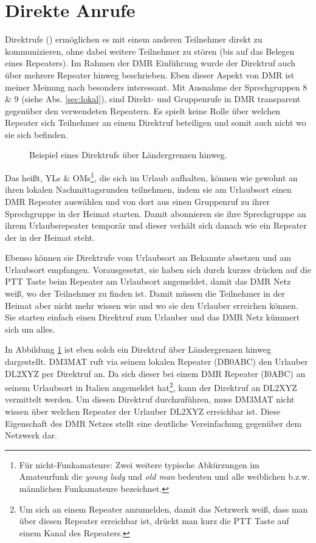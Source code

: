 \section{Direkte Anrufe} \label{sec:privatecall}
Direktrufe () ermöglichen es mit einem anderen Teilnehmer direkt zu kommunizieren, ohne dabei weitere Teilnehmer zu stören (bis auf das Belegen eines Repeaters). Im Rahmen der DMR Einführung wurde der Direktruf auch über mehrere Repeater hinweg beschrieben. Eben dieser Aspekt von DMR ist meiner Meinung nach besonders interessant. Mit Ausnahme der Sprechgruppen 8 \& 9 (siehe Abs. \ref{sec:lokal}), sind Direkt- und Gruppenrufe in DMR transparent gegenüber den verwendeten Repeatern. Es spielt keine Rolle über welchen Repeater sich Teilnehmer an einem Direktruf beteiligen und somit auch nicht wo sie sich befinden. 

\begin{figure}[!ht]
 \centering
 
 \caption{Beispiel eines Direktrufs über Ländergrenzen hinweg.} \label{fig:pc}
\end{figure}

Das heißt, YLs \& OMs\footnote{Für nicht-Funkamateure: Zwei weitere typische Abkürzungen im Amateurfunk die \emph{young lady} und \emph{old man} bedeuten und alle weiblichen b.z.w. männlichen Funkamateure bezeichnet.}, die sich im Urlaub aufhalten, können wie gewohnt an ihren lokalen Nachmittagsrunden teilnehmen, indem sie am Urlaubsort einen DMR Repeater auswählen und von dort aus einen Gruppenruf zu ihrer Sprechgruppe in der Heimat starten. Damit abonnieren sie ihre Sprechgruppe an ihrem Urlaubsrepeater temporär und dieser verhält sich danach wie ein Repeater der in der Heimat steht. 

Ebenso können sie Direktrufe vom Urlaubsort an Bekannte absetzen und am Urlaubsort empfangen. Vorausgesetzt, sie haben sich durch kurzes drücken auf die PTT Taste beim Repeater am Urlaubsort angemeldet, damit das DMR Netz weiß, wo der Teilnehmer zu finden ist. Damit müssen die Teilnehmer in der Heimat aber nicht mehr wissen wie und wo sie den Urlauber erreichen können. Sie starten einfach einen Direktruf zum Urlauber und das DMR Netz kümmert sich um alles.

In Abbildung \ref{fig:pc} ist eben solch ein Direktruf über Ländergrenzen hinweg dargestellt. DM3MAT ruft via seinem lokalen Repeater (DB0ABC) den Urlauber DL2XYZ per Direktruf an. Da sich dieser bei einem DMR Repeater (I0ABC) an seinem Urlaubsort in Italien angemeldet hat\footnote{Um sich an einem Repeater anzumelden, damit das Netzwerk weiß, dass man über diesen Repeater erreichbar ist, drückt man kurz die PTT Taste auf einem Kanal des Repeaters.}, kann der Direktruf an DL2XYZ vermittelt werden. Um diesen Direktruf durchzuführen, muss DM3MAT nicht wissen über welchen Repeater der Urlauber DL2XYZ erreichbar ist. Diese Eigenschaft des DMR Netzes stellt eine deutliche Vereinfachung gegenüber dem  Netzwerk dar. 